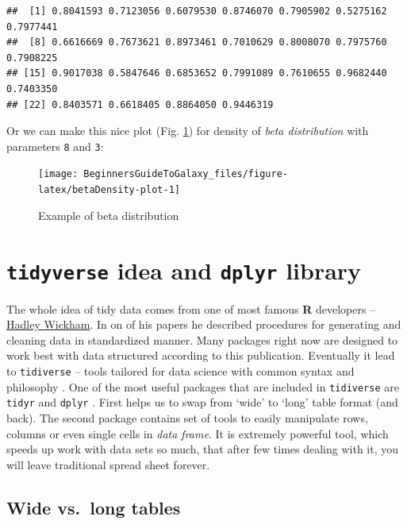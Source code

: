 \documentclass[]{book}
\theoremstyle{definition}
\theoremstyle{definition}
\theoremstyle{definition}
\theoremstyle{remark}
\begin{document}
\begin{verbatim}
##  [1] 0.8041593 0.7123056 0.6079530 0.8746070 0.7905902 0.5275162 0.7977441
##  [8] 0.6616669 0.7673621 0.8973461 0.7010629 0.8008070 0.7975760 0.7908225
## [15] 0.9017038 0.5847646 0.6853652 0.7991089 0.7610655 0.9682440 0.7403350
## [22] 0.8403571 0.6618405 0.8864050 0.9446319
\end{verbatim}

Or we can make this nice plot (Fig. \ref{fig:betaDensity-plot}) for
density of \emph{beta distribution} with parameters \texttt{8} and
\texttt{3}:

\begin{figure}

{\centering \texttt{[image: BeginnersGuideToGalaxy\_files/figure-latex/betaDensity-plot-1]} 

}

\caption{Example of beta distribution}\label{fig:betaDensity-plot}
\end{figure}

\section{\texorpdfstring{\texttt{tidyverse} idea and \texttt{dplyr}
library}{tidyverse idea and dplyr library}}\label{tidyverse-idea-and-dplyr-library}

The whole idea of tidy data comes from one of most famous \textbf{R}
developers -- \href{http://hadley.nz/}{Hadley Wickham}. In on of his
papers \citep{hadley2014} he described procedures for generating and
cleaning data in standardized manner. Many packages right now are
designed to work best with data structured according to this
publication. Eventually it lead to \texttt{tidiverse} -- tools tailored
for data science with common syntax and philosophy \citep{R-tidyverse}.
One of the most useful packages that are included in \texttt{tidiverse}
\citep{R-tidyverse} are \texttt{tidyr} \citep{R-tidyr} and
\texttt{dplyr} \citep{R-dplyr}. First helps us to swap from `wide' to
`long' table format (and back). The second package contains set of tools
to easily manipulate rows, columns or even single cells in \emph{data
frame}. It is extremely powerful tool, which speeds up work with data
sets so much, that after few times dealing with it, you will leave
traditional spread sheet forever.

\subsection{Wide vs.~long tables}\label{wide-vs.long-tables}
\end{document}
